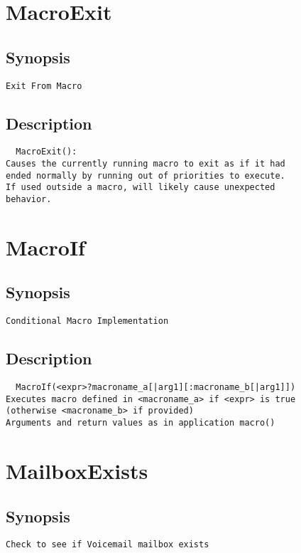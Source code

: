 \section{MacroExit}
\subsection{Synopsis}
\begin{verbatim}
Exit From Macro
\end{verbatim}
\subsection{Description}
\begin{verbatim}
  MacroExit():
Causes the currently running macro to exit as if it had
ended normally by running out of priorities to execute.
If used outside a macro, will likely cause unexpected
behavior.

\end{verbatim}


\section{MacroIf}
\subsection{Synopsis}
\begin{verbatim}
Conditional Macro Implementation
\end{verbatim}
\subsection{Description}
\begin{verbatim}
  MacroIf(<expr>?macroname_a[|arg1][:macroname_b[|arg1]])
Executes macro defined in <macroname_a> if <expr> is true
(otherwise <macroname_b> if provided)
Arguments and return values as in application macro()

\end{verbatim}


\section{MailboxExists}
\subsection{Synopsis}
\begin{verbatim}
Check to see if Voicemail mailbox exists
\end{verbatim}
